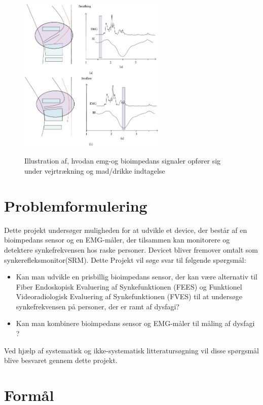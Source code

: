 \begin{figure}[H]
\centering
{\includegraphics[width=7cm]
{Figure/EMGBIGraph}}
\caption{Illustration af, hvodan emg-og bioimpedans signaler opfører sig under vejrtrækning og mad/drikke indtagelse\cite{Schultheiss2014}}
\label{EMGBIGraph} 
\end{figure}

\section{Problemformulering}

Dette projekt undersøger muligheden for at udvikle et device, der består af en bioimpedans sensor og en EMG-måler, der tilsammen kan monitorere og detektere synkefrekvensen hos raske personer. Devicet bliver fremover omtalt som synkerefleksmonitor(SRM). Dette Projekt vil søge svar til følgende spørgsmål: 

\begin{itemize}
\item Kan man udvikle en prisbillig bioimpedans sensor, der kan være alternativ til Fiber Endoskopisk Evaluering af Synkefunktionen (FEES) og Funktionel Videoradiologisk Evaluering af Synkefunktionen (FVES) til at undersøge synkefrekvensen på personer, der er ramt af dysfagi?
\item Kan man kombinere bioimpedans sensor og EMG-måler til måling af dysfagi ?


\end{itemize}
Ved hjælp af systematisk og ikke-systematisk litteratursøgning vil disse spørgsmål blive besvaret gennem dette projekt. 

\section{Formål}


